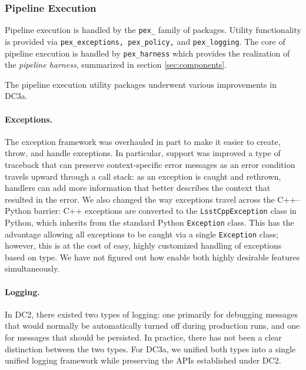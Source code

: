 
\subsubsection{Pipeline Execution} \label{sec:pex}

Pipeline execution is handled by the {\tt pex\_} family of packages.
Utility functionality is provided via {\tt pex\_exceptions,
pex\_policy,} and {\tt pex\_logging}.  The core of pipeline execution
is handled by {\tt pex\_harness} which provides the realization of the
{\it pipeline harness}, summarized in section \ref{sec:components}.


The pipeline execution utility packages underwent various
improvements in DC3a.

\paragraph{Exceptions.}  The exception framework was overhauled in
part to make it easier to create, throw, and handle exceptions.  In
particular, support was improved a type of traceback that can preserve
context-specific error messages as an error condition travels upward
through a call stack: as an exception is caught and rethrown, handlers
can add more information that better describes the context that
resulted in the error.  We also changed the way exceptions travel
across the C++--Python barrier: C++ exceptions are converted to the
{\tt LsstCppException} class in Python, which inherits from the
standard Python {\tt Exception} class.  This has the advantage
allowing all exceptions to be caught via a single {\tt Exception}
class; however, this is at the cost of easy, highly customized
handling of exceptions based on type.  We have not figured out how
enable both highly desirable features simultaneously.  

\paragraph{Logging.}  In DC2, there existed two types of logging:  one
primarily for debugging messages that would normally be automatically
turned off during production runs, and one for messages that should be
persisted.  In practice, there has not been a clear distinction
between the two types.  For DC3a, we unified both types into a single
unified logging framework while preserving the APIs established under
DC2.  

